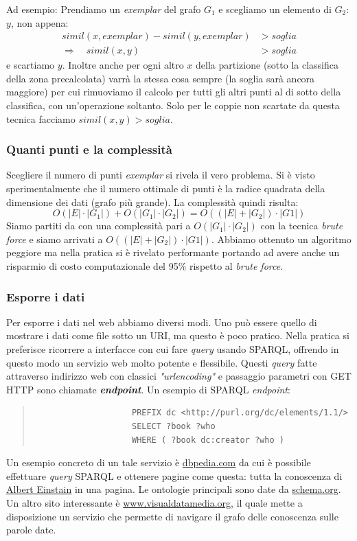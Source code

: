 			Ad esempio:
				Prendiamo un \emph{exemplar} del grafo $G_1$ e scegliamo un elemento di $G_2$: $y$, non appena:
				\begin{align}
					simil(x,exemplar)-simil(y,exemplar)&>soglia \\
					\Rightarrow \quad simil(x,y)&>soglia
				\end{align}
				e scartiamo $y$. Inoltre anche per ogni altro $x$ della partizione (sotto la classifica della zona precalcolata) varrà la stessa cosa sempre (la soglia sarà ancora maggiore) per cui rimuoviamo il calcolo per tutti gli altri punti al di sotto della classifica, con un'operazione soltanto.	
				Solo per le coppie non scartate da questa tecnica facciamo $simil(x,y)>soglia$.
		
			\subsubsection{Quanti punti e la complessità}
				Scegliere il numero di punti \emph{exemplar} si rivela il vero problema. Si è visto sperimentalmente che il numero ottimale di punti è la radice quadrata della  dimensione dei dati (grafo più grande). La complessità quindi risulta:
				\[
					O(|E| \cdot |G_1|) + O(|G_1| \cdot |G_2|) = O((|E| + |G_2|) \cdot |G1|)
				\]
				Siamo partiti da con una complessità pari a $O(|G_1|\cdot|G_2|)$ con la tecnica \emph{brute force} e siamo arrivati a $O((|E| + |G_2|) \cdot |G1|)$. Abbiamo ottenuto un algoritmo peggiore ma nella pratica si è rivelato performante portando ad avere anche un risparmio di costo computazionale del 95\% rispetto al \emph{brute force}.
			
			\subsubsection{Esporre i dati}
				Per esporre i dati nel web abbiamo diversi modi. Uno può essere quello di mostrare i dati come file sotto un URI, ma questo è poco pratico. Nella pratica si preferisce ricorrere a interfacce con cui fare \emph{query} usando SPARQL, offrendo in questo modo un servizio web molto potente e flessibile. Questi \emph{query} fatte attraverso indirizzo web con classici \emph{"urlencoding"} e passaggio parametri con GET HTTP sono chiamate \textbf{\emph{endpoint}}. Un esempio di SPARQL \emph{endpoint}:
				\begin{quote}
				\begin{verbatim}
					PREFIX dc <http://purl.org/dc/elements/1.1/>
					SELECT ?book ?who
					WHERE ( ?book dc:creator ?who )
				\end{verbatim}
				\end{quote}
				Un esempio concreto di un tale servizio è \href{http://wiki.dbpedia.org/}{dbpedia.com} da cui è possibile effettuare \emph{query} SPARQL e ottenere pagine come questa: tutta la conoscenza di \href{http://dbpedia.org/page/Albert_Einstein}{Albert Einstain} in una pagina.
				Le ontologie principali sono date da \href{https://schema.org/}{schema.org}. Un altro sito interessante è \href{http://www.visualdataweb.org/relfinder.php}{www.visualdatamedia.org}, il quale mette a disposizione un servizio che permette di navigare il grafo delle conoscenza sulle parole date. 
					
					
					